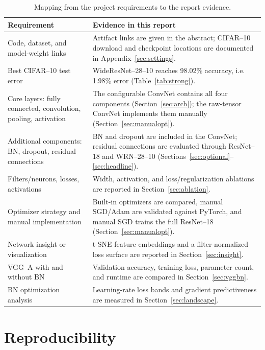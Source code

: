 \documentclass[11pt]{article}
\newcommand{\bestAcc}{98.02}     %
\newcommand{\bestErr}{1.98}      %
\begin{document}
\begin{table}[htbp]
\centering
\small
\caption{Mapping from the project requirements to the report evidence.}
\label{tab:coverage}
\begin{tabularx}{\textwidth}{>{\raggedright\arraybackslash}p{}X}
\toprule
Requirement & Evidence in this report \\
\midrule
Code, dataset, and model-weight links &
Artifact links are given in the abstract; CIFAR--10 download and checkpoint
locations are documented in Appendix~\ref{sec:settings}. \\
Best CIFAR--10 test error &
WideResNet--28--10 reaches \bestAcc\% accuracy, i.e. \bestErr\% error
(Table~\ref{tab:strong}). \\
Core layers: fully connected, convolution, pooling, activation &
The configurable ConvNet contains all four components
(Section~\ref{sec:arch}); the raw-tensor ConvNet implements them manually
(Section~\ref{sec:manualopt}). \\
Additional components: BN, dropout, residual connections &
BN and dropout are included in the ConvNet; residual connections are evaluated
through ResNet--18 and WRN--28--10
(Sections~\ref{sec:optional}--\ref{sec:headline}). \\
Filters/neurons, losses, activations &
Width, activation, and loss/regularization ablations are reported in
Section~\ref{sec:ablation}. \\
Optimizer strategy and manual implementation &
Built-in optimizers are compared, manual SGD/Adam are validated against
PyTorch, and manual SGD trains the full ResNet--18
(Section~\ref{sec:manualopt}). \\
Network insight or visualization &
t-SNE feature embeddings and a filter-normalized loss surface are reported in
Section~\ref{sec:insight}. \\
VGG--A with and without BN &
Validation accuracy, training loss, parameter count, and runtime are compared
in Section~\ref{sec:vggbn}. \\
BN optimization analysis &
Learning-rate loss bands and gradient predictiveness are measured in
Section~\ref{sec:landscape}. \\
\bottomrule
\end{tabularx}
\end{table}

\section{Reproducibility}
\label{sec:repro}
\end{document}
